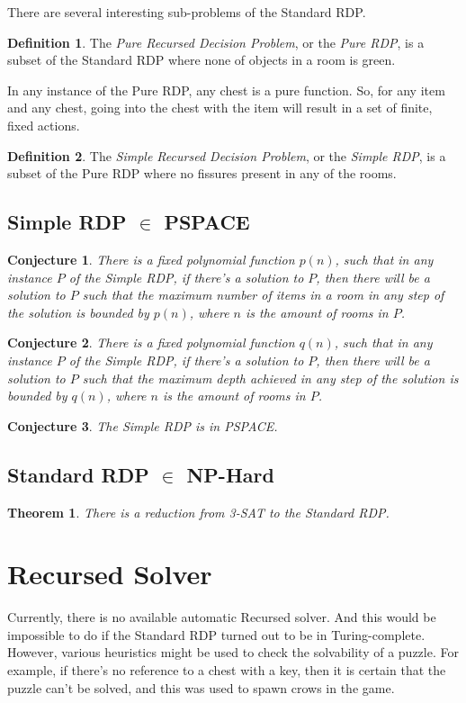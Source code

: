 \documentclass[a4paper]{article}
\newtheorem{theorem}{Theorem}[section]
\newtheorem{conjecture}{Conjecture}[section]
\theoremstyle{definition}
\newtheorem{definition}{Definition}[section]
\begin{document}
There are several interesting sub-problems of the Standard RDP.
\begin{definition}
The \emph{Pure Recursed Decision Problem}, or the \emph{Pure RDP}, is a subset of the Standard RDP where none of objects in a room is green.
\end{definition}
In any instance of the Pure RDP, any chest is a pure function. So, for any item and any chest, going into the chest with the item will result in a set of finite, fixed actions.

\begin{definition}
The \emph{Simple Recursed Decision Problem}, or the \emph{Simple RDP}, is a subset of the Pure RDP where no fissures present in any of the rooms.
\end{definition}

\subsection{Simple RDP $\in$ PSPACE}
\begin{conjecture}
There is a fixed polynomial function $p(n)$, such that in any instance $P$ of the Simple RDP, if there's a solution to $P$,
then there will be a solution to $P$ such that the maximum number of items in a room in any step of the solution is bounded by $p(n)$,
where $n$ is the amount of rooms in $P$.
\end{conjecture}

\begin{conjecture}
There is a fixed polynomial function $q(n)$, such that in any instance $P$ of the Simple RDP, if there's a solution to $P$,
then there will be a solution to $P$ such that the maximum depth achieved in any step of the solution is bounded by $q(n)$,
where $n$ is the amount of rooms in $P$.
\end{conjecture}

\begin{conjecture}
The Simple RDP is in PSPACE.
\end{conjecture}

\subsection{Standard RDP $\in$ NP-Hard}
\begin{theorem}
There is a reduction from 3-SAT to the Standard RDP.
\end{theorem}

\section{Recursed Solver}
Currently, there is no available automatic Recursed solver. And this would be impossible to do if the Standard RDP turned out to be in Turing-complete.
However, various heuristics might be used to check the solvability of a puzzle. For example, if there's no reference
to a chest with a key, then it is certain that the puzzle can't be solved, and this was used to spawn crows in the game.
\end{document}

